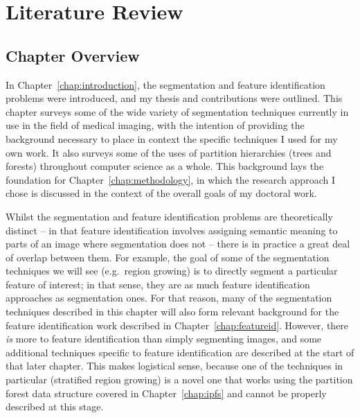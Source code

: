 \chapter{Literature Review}
\label{chap:background}

\section{Chapter Overview}

In Chapter~\ref{chap:introduction}, the segmentation and feature identification problems were introduced, and my thesis and contributions were outlined. This chapter surveys some of the wide variety of segmentation techniques currently in use in the field of medical imaging, with the intention of providing the background necessary to place in context the specific techniques I used for my own work. It also surveys some of the uses of partition hierarchies (trees and forests) throughout computer science as a whole. This background lays the foundation for Chapter~\ref{chap:methodology}, in which the research approach I chose is discussed in the context of the overall goals of my doctoral work.

Whilst the segmentation and feature identification problems are theoretically distinct -- in that feature identification involves assigning semantic meaning to parts of an image where segmentation does not -- there is in practice a great deal of overlap between them. For example, the goal of some of the segmentation techniques we will see (e.g.~region growing) is to directly segment a particular feature of interest; in that sense, they are as much feature identification approaches as segmentation ones. For that reason, many of the segmentation techniques described in this chapter will also form relevant background for the feature identification work described in Chapter~\ref{chap:featureid}. However, there \emph{is} more to feature identification than simply segmenting images, and some additional techniques specific to feature identification are described at the start of that later chapter. This makes logistical sense, because one of the techniques in particular (stratified region growing) is a novel one that works using the partition forest data structure covered in Chapter~\ref{chap:ipfs} and cannot be properly described at this stage.

